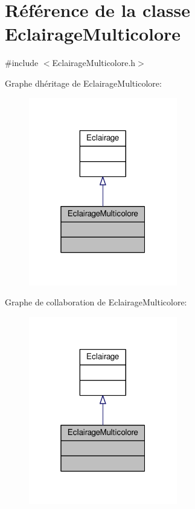 \hypertarget{classEclairageMulticolore}{}\section{Référence de la classe Eclairage\+Multicolore}
\label{classEclairageMulticolore}


{\ttfamily \#include $<$Eclairage\+Multicolore.\+h$>$}



Graphe d\textquotesingle{}héritage de Eclairage\+Multicolore\+:\nopagebreak
\begin{figure}[H]
\begin{center}
\leavevmode
\includegraphics[width=184pt]{classEclairageMulticolore__inherit__graph}
\end{center}
\end{figure}


Graphe de collaboration de Eclairage\+Multicolore\+:\nopagebreak
\begin{figure}[H]
\begin{center}
\leavevmode
\includegraphics[width=184pt]{classEclairageMulticolore__coll__graph}
\end{center}
\end{figure}
